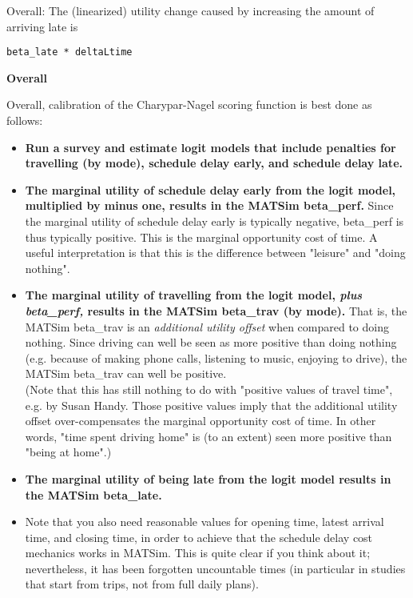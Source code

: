 \documentclass[a4paper,11pt]{report}
\begin{document}
Overall: The (linearized) utility change caused by increasing the amount of arriving late is
\begin{verbatim}
beta_late * deltaLtime

\end{verbatim}

\textbf{Overall}

Overall, calibration of the Charypar-Nagel scoring function is best done as follows:
\begin{itemize}
	\item \textbf{Run a survey and estimate logit models that include  penalties for travelling (by mode), schedule delay early, and schedule  delay late.}
	\item \textbf{The marginal utility of schedule delay early from the logit  model, multiplied by minus one, results in the MATSim beta\_perf.}  Since the marginal utility of schedule delay early is typically  negative, beta\_perf is thus typically positive. This is the  marginal opportunity cost of time. A useful interpretation is that  this is the difference between "leisure" and "doing nothing".
	\item \textbf{The marginal utility of travelling from the logit model, \emph{plus beta\_perf,} results in the MATSim beta\_trav (by mode).} That is, the MATSim beta\_trav is an \emph{additional utility offset}  when compared to doing nothing. Since driving can well be seen as  more positive than doing nothing (e.g. because of making phone calls,  listening to music, enjoying to drive), the MATSim beta\_trav can well be  positive.
\\   (Note that this has still nothing to do with "positive values of  travel time", e.g. by Susan Handy. Those positive values imply  that the additional utility offset over-compensates the marginal  opportunity cost of time. In other words, "time spent driving  home" is (to an extent) seen more positive than "being at home".)
	\item \textbf{The marginal utility of being late from the logit model results in the MATSim beta\_late.}
	\item Note that you also need reasonable values for opening time, latest  arrival time, and closing time, in order to achieve that the schedule  delay cost mechanics works in MATSim. This is quite clear if you  think about it; nevertheless, it has been forgotten uncountable times  (in particular in studies that start from trips, not from full daily  plans).
\end{itemize}
\end{document}
